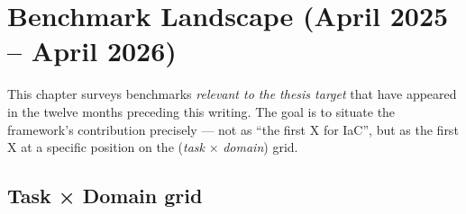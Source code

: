 \documentclass[11pt, a4paper]{report}
\begin{document}
\chapter{Benchmark Landscape (April 2025 -- April 2026)}
\label{chap:landscape}

This chapter surveys benchmarks \emph{relevant to the thesis target} that
have appeared in the twelve months preceding this writing. The goal is to
situate the framework's contribution precisely --- not as ``the first
X for IaC'', but as the first X at a specific position on the
(\emph{task} $\times$ \emph{domain}) grid.

\section{Task × Domain grid}
\end{document}
